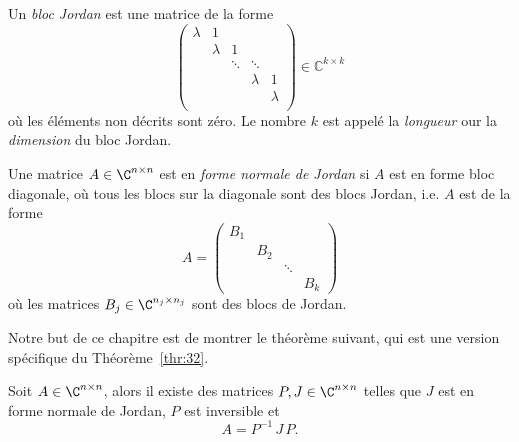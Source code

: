 



\begin{definition}
  Un \emph{bloc Jordan} est une matrice de la forme 
  \begin{displaymath}
    \begin{pmatrix}
      λ & 1 \\
        & λ & 1 \\
        &   & \ddots & \ddots \\ 
        &   &             & λ & 1 \\
        &   &         &  & λ  \\
    \end{pmatrix} ∈ ℂ^{k ×k} 
  \end{displaymath}
où les éléments non décrits sont zéro. Le nombre $k$ est appelé la \emph{longueur} our la \emph{dimension} du bloc Jordan. 

Une matrice $A \in \C^{n \times n}$ est en \emph{forme normale de Jordan} si $A$ est en forme bloc diagonale, où tous les blocs sur la diagonale sont des blocs Jordan, i.e. $A$ est de la forme
\begin{displaymath}
  A =
  \begin{pmatrix}
    B_1 \\
        & B_2 \\
        &    & \ddots \\
        &    &       & B_k
  \end{pmatrix}
\end{displaymath}
où les matrices $B_j \in \C^{n_j\times n_j}$ sont des blocs de Jordan. 
\end{definition}


Notre but de ce chapitre  est de montrer le théorème suivant, qui est une version spécifique du  Théorème~\ref{thr:32}.

\begin{theorem}
  \label{thr:41}
  Soit $A \in \C^{n \times n}$, alors il existe des matrices $P,J \in \C^{n \times n}$ telles que $J$ est en forme normale de Jordan, $P$ est inversible et 
  \begin{displaymath}
    A = P^{-1} \,J \,P. 
  \end{displaymath}
\end{theorem}

